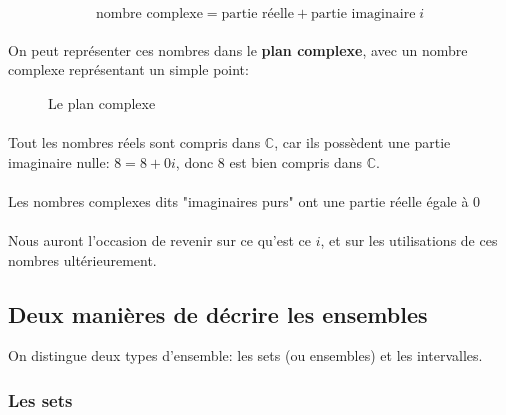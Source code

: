 \documentclass[a4paper]{book}
\begin{document}
    $$\text{nombre complexe} = \text{partie réelle} + \text{partie imaginaire}\;i$$
    
    \paragraph{}
    On peut représenter ces nombres dans le \textbf{plan complexe}, avec un nombre complexe représentant un simple point:
    
    \begin{figure}[H]
        \centering
        \caption{Le plan complexe}
        \label{fig:complexplane}
    \end{figure}
    
    \paragraph{}
    Tout les nombres réels sont compris dans $\mathds{C}$, car ils possèdent une partie imaginaire nulle:
    $8 = 8 + 0i$, donc $8$ est bien compris dans $\mathds{C}$.
    \paragraph{}
    Les nombres complexes dits "imaginaires purs" ont une partie réelle égale à $0$
    
    \paragraph{}
    Nous auront l'occasion de revenir sur ce qu'est ce $i$, et sur les utilisations de ces nombres ultérieurement.
    
    \subsection{Deux manières de décrire les ensembles}
    On distingue deux types d'ensemble: les sets (ou ensembles) et les intervalles.
    \subsubsection{Les sets}
\end{document}
